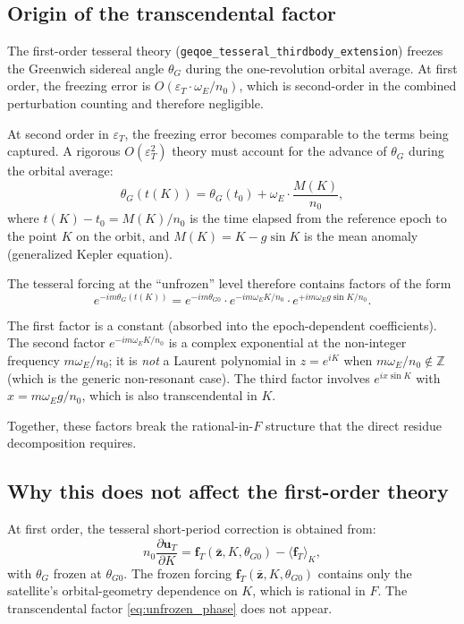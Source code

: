 \documentclass[11pt]{article}
\newcommand{\eps}{\varepsilon}
\newcommand{\mean}[1]{\langle #1 \rangle}
\newcommand{\tesseral}{geqoe\_tesseral\_thirdbody\_extension}
\begin{document}
\subsection{Origin of the transcendental factor}

The first-order tesseral theory (\texttt{\tesseral{}}) freezes the
Greenwich sidereal angle $\theta_G$ during the one-revolution orbital
average. At first order, the freezing error is
$O(\eps_T \cdot \omega_E / n_0)$, which is second-order in the combined
perturbation counting and therefore negligible.

At second order in $\eps_T$, the freezing error becomes comparable to the
terms being captured. A rigorous $O(\eps_T^2)$ theory must account for
the advance of $\theta_G$ during the orbital average:
\begin{equation}
\theta_G(t(K)) = \theta_G(t_0) + \omega_E \cdot \frac{M(K)}{n_0},
\label{eq:theta_advance}
\end{equation}
where $t(K) - t_0 = M(K) / n_0$ is the time elapsed from the reference
epoch to the point $K$ on the orbit, and $M(K) = K - g\sin K$ is the
mean anomaly (generalized Kepler equation).

The tesseral forcing at the ``unfrozen'' level therefore contains factors
of the form
\begin{equation}
e^{-im\theta_G(t(K))}
= e^{-im\theta_{G0}} \cdot e^{-im\omega_E K / n_0}
\cdot e^{+im\omega_E g \sin K / n_0}.
\label{eq:unfrozen_phase}
\end{equation}

The first factor is a constant (absorbed into the epoch-dependent
coefficients). The second factor $e^{-im\omega_E K / n_0}$ is a complex
exponential at the non-integer frequency $m\omega_E / n_0$; it is
\emph{not} a Laurent polynomial in $z = e^{iK}$ when $m\omega_E/n_0
\notin \mathbb{Z}$ (which is the generic non-resonant case). The third
factor involves $e^{ix\sin K}$ with $x = m\omega_E g / n_0$, which is
also transcendental in $K$.

Together, these factors break the rational-in-$F$ structure that the
direct residue decomposition requires.

\subsection{Why this does not affect the first-order theory}

At first order, the tesseral short-period correction is obtained from:
\begin{equation}
n_0 \frac{\partial \bm u_T}{\partial K}
= \bm f_T(\bar{\bm z}, K, \theta_{G0})
- \mean{\bm f_T}_K,
\end{equation}
with $\theta_G$ frozen at $\theta_{G0}$. The frozen forcing
$\bm f_T(\bar{\bm z}, K, \theta_{G0})$ contains only the satellite's
orbital-geometry dependence on $K$, which is rational in $F$. The
transcendental factor \eqref{eq:unfrozen_phase} does not appear.
\end{document}
